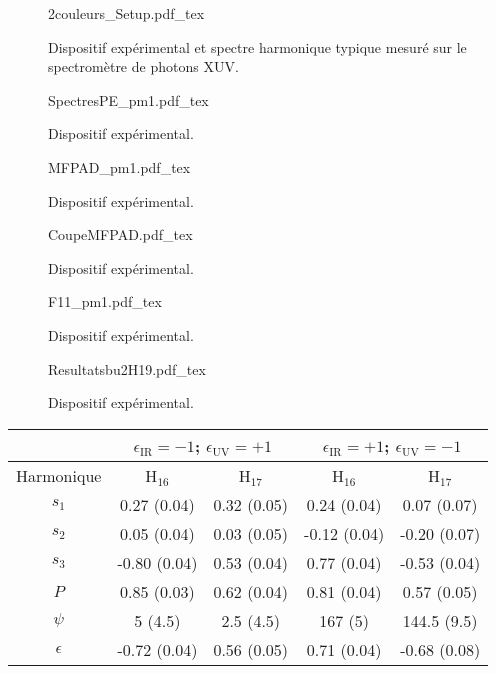 \begin{figure}
\centering
\def\svgwidth{\textwidth}
{2couleurs_Setup.pdf_tex}
\caption{Dispositif expérimental et spectre harmonique typique mesuré sur le spectromètre de photons XUV.}
\label{fig:2couleurs_Setup}
\end{figure}

\begin{figure}
\centering
\def\svgwidth{\textwidth}
{SpectresPE_pm1.pdf_tex}
\caption{Dispositif expérimental.}
\label{fig:SpectresPE_pm1}
\end{figure}

\begin{figure}
\centering
\def\svgwidth{0.8\textwidth}
{MFPAD_pm1.pdf_tex}
\caption{Dispositif expérimental.}
\label{fig:MFPAD_pm1}
\end{figure}

\begin{figure}
\centering
\def\svgwidth{0.7\textwidth}
{CoupeMFPAD.pdf_tex}
\caption{Dispositif expérimental.}
\label{fig:CoupeMFPAD}
\end{figure}

\begin{figure}
\centering
\def\svgwidth{\textwidth}
{F11_pm1.pdf_tex}
\caption{Dispositif expérimental.}
\label{fig:F11_pm1}
\end{figure}

\begin{figure}
\centering
\def\svgwidth{\textwidth}
{Resultatsbu2H19.pdf_tex}
\caption{Dispositif expérimental.}
\label{fig:Resultatsbu2H19}
\end{figure}

\begin{table}[ht]
\centering
\begin{tabular}{|c||c|c|c|c|}
\hline
 & \multicolumn{2}{c|}{$\epsilon_{\text{IR}} = -1$; $\epsilon_{\text{UV}} = +1$} &  \multicolumn{2}{c|}{$\epsilon_{\text{IR}} = +1$; $\epsilon_{\text{UV}} = -1$} \\
\hline
Harmonique & H$_{16}$ & H$_{17}$ & H$_{16}$ & H$_{17}$ \\
\hline
$s_1$ & 0.27 (0.04) & 0.32 (0.05) & 0.24 (0.04) & 0.07 (0.07) \\
\hline
$s_2$ & 0.05 (0.04) & 0.03 (0.05) & -0.12 (0.04) & -0.20 (0.07) \\
\hline
$s_3$ & -0.80 (0.04) & 0.53 (0.04) & 0.77 (0.04) & -0.53 (0.04) \\
\hline
$P$ & 0.85 (0.03) & 0.62 (0.04) & 0.81 (0.04) & 0.57 (0.05) \\
\hline
$\psi$ & 5 (4.5) & 2.5 (4.5) & 167 (5) & 144.5 (9.5) \\
\hline
$\epsilon$ & -0.72 (0.04) & 0.56 (0.05) & 0.71 (0.04) & -0.68 (0.08) \\
\hline
\end{tabular}
\label{tab:resultatspm1}
\end{table}


